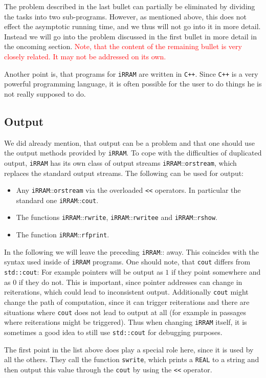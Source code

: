 \documentclass{article}
\newcommand{\irram}{\texttt{iRRAM}\xspace}
\newcommand{\cc}{\texttt{C++}\xspace}
\newcommand{\ir}[1]{\texttt{#1}}
\newcommand{\code}[1]{\texttt{#1}}
\newcommand{\temp}[1]{\textcolor{red}{#1}}
\begin{document}
The problem described in the last bullet can partially be eliminated by dividing the tasks into two sub-programs. However, as mentioned above, this does not effect the asymptotic running time, and we thus will not go into it in more detail. Instead we will go into the problem discussed in the first bullet in more detail in the oncoming section. \temp{Note, that the content of the remaining bullet is very closely related. It may not be addressed on its own.}

Another point is, that programs for \irram are written in \cc. Since \cc is a very powerful programming language, it is often possible for the user to do things he is not really supposed to do.

\subsection{Output}

We did already mention, that output can be a problem and that one should use the output methods provided by \irram. To cope with the difficulties of duplicated output, \irram has its own class of output streams \irram::\ir{orstream}, which replaces the standard output streams. The following can be used for output:
\begin{itemize}
\item Any \irram::\ir{orstream} via the overloaded \ir{<<} operators. In particular the standard one \irram::\ir{cout}.
\item The functions \irram::\ir{rwrite}, \irram::\ir{rwritee} and \irram::\ir{rshow}.
\item The function \irram::\ir{rfprint}.
\end{itemize}
In the following we will leave the preceding \irram::\ir{} away. This coincides with the syntax used inside of \irram programs. One should note, that \ir{cout} differs from \code{std::cout}: For example pointers will be output as $1$ if they point somewhere and as $0$ if they do not. This is important, since pointer addresses can change in reiterations, which could lead to inconsistent output. Additionally \ir{cout} might change the path of computation, since it can trigger reiterations and there are situations where \ir{cout} does not lead to output at all (for example in passages where reiterations might be triggered). Thus when changing \irram itself, it is sometimes a good idea to still use \code{std::cout} for debugging purposes.

The first point in the list above does play a special role here, since it is used by all the others. They call the function \ir{swrite}, which prints a \ir{REAL} to a string and then output this value through the \ir{cout} by using the \ir{<<} operator.
\end{document}
